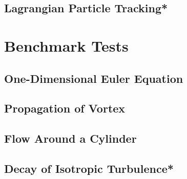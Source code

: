 \documentclass[12pt, letterpaper]{report}
\begin{document}
\section{Lagrangian Particle Tracking*}

\chapter{Benchmark Tests}

\section{One-Dimensional Euler Equation}

\section{Propagation of Vortex}

\section{Flow Around a Cylinder}

\section{Decay of Isotropic Turbulence*}










\clearpage


\end{document}
